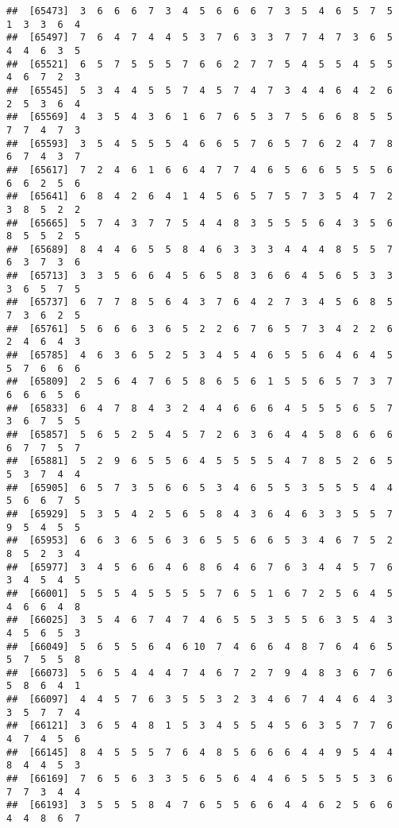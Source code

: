 \documentclass[
]{book}
\begin{document}
\begin{verbatim}
##  [65473]  3  6  6  6  7  3  4  5  6  6  6  7  3  5  4  6  5  7  5  1  3  3  6  4
##  [65497]  7  6  4  7  4  4  5  3  7  6  3  3  7  7  4  7  3  6  5  4  4  6  3  5
##  [65521]  6  5  7  5  5  5  7  6  6  2  7  7  5  4  5  5  4  5  5  4  6  7  2  3
##  [65545]  5  3  4  4  5  5  7  4  5  7  4  7  3  4  4  6  4  2  6  2  5  3  6  4
##  [65569]  4  3  5  4  3  6  1  6  7  6  5  3  7  5  6  6  8  5  5  7  7  4  7  3
##  [65593]  3  5  4  5  5  5  4  6  6  5  7  6  5  7  6  2  4  7  8  6  7  4  3  7
##  [65617]  7  2  4  6  1  6  6  4  7  7  4  6  5  6  6  5  5  5  6  6  6  2  5  6
##  [65641]  6  8  4  2  6  4  1  4  5  6  5  7  5  7  3  5  4  7  2  3  8  5  2  2
##  [65665]  5  7  4  3  7  7  5  4  4  8  3  5  5  5  6  4  3  5  6  8  5  5  2  5
##  [65689]  8  4  4  6  5  5  8  4  6  3  3  3  4  4  4  8  5  5  7  6  3  7  3  6
##  [65713]  3  3  5  6  6  4  5  6  5  8  3  6  6  4  5  6  5  3  3  3  6  5  7  5
##  [65737]  6  7  7  8  5  6  4  3  7  6  4  2  7  3  4  5  6  8  5  7  3  6  2  5
##  [65761]  5  6  6  6  3  6  5  2  2  6  7  6  5  7  3  4  2  2  6  2  4  6  4  3
##  [65785]  4  6  3  6  5  2  5  3  4  5  4  6  5  5  6  4  6  4  5  5  7  6  6  6
##  [65809]  2  5  6  4  7  6  5  8  6  5  6  1  5  5  6  5  7  3  7  6  6  6  5  6
##  [65833]  6  4  7  8  4  3  2  4  4  6  6  6  4  5  5  5  6  5  7  3  6  7  5  5
##  [65857]  5  6  5  2  5  4  5  7  2  6  3  6  4  4  5  8  6  6  6  6  7  7  5  7
##  [65881]  5  2  9  6  5  5  6  4  5  5  5  5  4  7  8  5  2  6  5  5  3  7  4  4
##  [65905]  6  5  7  3  5  6  6  5  3  4  6  5  5  3  5  5  5  4  4  5  6  6  7  5
##  [65929]  5  3  5  4  2  5  6  5  8  4  3  6  4  6  3  3  5  5  7  9  5  4  5  5
##  [65953]  6  6  3  6  5  6  3  6  5  5  6  6  5  3  4  6  7  5  2  8  5  2  3  4
##  [65977]  3  4  5  6  6  4  6  8  6  4  6  7  6  3  4  4  5  7  6  3  4  5  4  5
##  [66001]  5  5  5  4  5  5  5  5  7  6  5  1  6  7  2  5  6  4  5  4  6  6  4  8
##  [66025]  3  5  4  6  7  4  7  4  6  5  5  3  5  5  6  3  5  4  3  4  5  6  5  3
##  [66049]  5  6  5  5  6  4  6 10  7  4  6  6  4  8  7  6  4  6  5  5  7  5  5  8
##  [66073]  5  6  5  4  4  4  7  4  6  7  2  7  9  4  8  3  6  7  6  5  8  6  4  1
##  [66097]  4  4  5  7  6  3  5  5  3  2  3  4  6  7  4  4  6  4  3  3  5  7  7  4
##  [66121]  3  6  5  4  8  1  5  3  4  5  5  4  5  6  3  5  7  7  6  4  7  4  5  6
##  [66145]  8  4  5  5  5  7  6  4  8  5  6  6  6  4  4  9  5  4  4  8  4  4  5  3
##  [66169]  7  6  5  6  3  3  5  6  5  6  4  4  6  5  5  5  5  3  6  7  7  3  4  4
##  [66193]  3  5  5  5  8  4  7  6  5  5  6  6  4  4  6  2  5  6  6  4  4  8  6  7

\end{verbatim}
\end{document}
